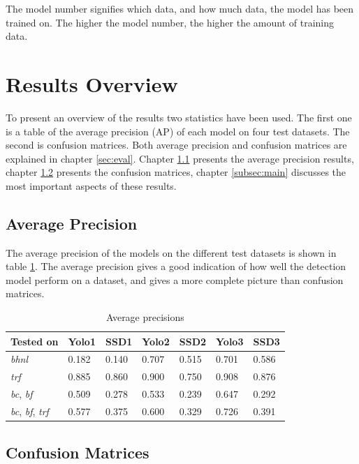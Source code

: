 \vspace{3mm}

The model number signifies which data, and how much data, the model has been trained on. The higher the model number, the higher the amount of training data.


\section{Results Overview}

To present an overview of the results two statistics have been used. The first one is a table of the average precision (AP) of each model on four test datasets. The second is confusion matrices. Both average precision and confusion matrices are explained in chapter \ref{sec:eval}. Chapter \ref{subsec:ap} presents the average precision results, chapter \ref{subsec:cm} presents the confusion matrices, chapter \ref{subsec:main} discusses the most important aspects of these results.

\newpage

\subsection{Average Precision}
\label{subsec:ap}

The average precision of the models on the different test datasets is shown in table \ref{ap_tab}. The average precision gives a good indication of how well the detection model perform on a dataset, and gives a more complete picture than confusion matrices.

\begin{table}[h!]
\centering
\begin{tabular}{l|ll|ll|ll}
Tested on   & Yolo1 & SSD1  & Yolo2 & SSD2  & Yolo3 & SSD3  \\ \hline
\textit{bhnl}        & 0.182 & 0.140 & 0.707 & 0.515 & 0.701 & 0.586 \\
\textit{trf}         & 0.885 & 0.860 & 0.900 & 0.750 & 0.908 & 0.876 \\
\textit{bc}, \textit{bf}      & 0.509 & 0.278 & 0.533 & 0.239 & 0.647 & 0.292 \\
\textit{bc}, \textit{bf}, \textit{trf} & 0.577 & 0.375 & 0.600 & 0.329 & 0.726 & 0.391
\end{tabular}
\caption{Average precisions}
\label{ap_tab}
\end{table}


\subsection{Confusion Matrices}
\label{subsec:cm}

